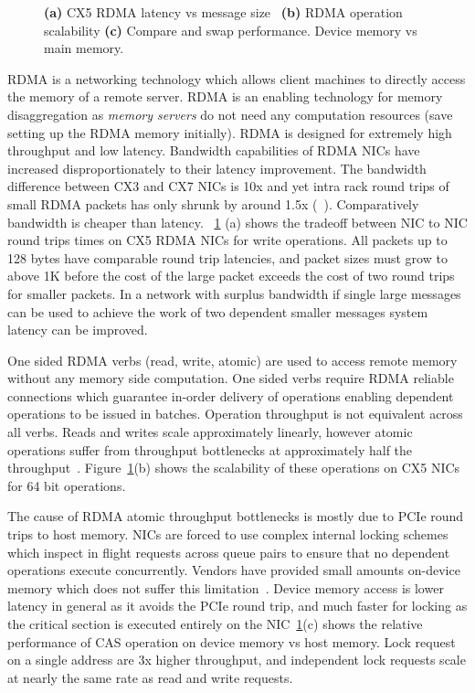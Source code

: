 \begin{figure}[t]
\begin{subfigure}{0.3\linewidth}
    \end{subfigure}
    \vspace{-1em}
    \caption{
    \textbf{(a)} CX5 RDMA latency vs message size~\cite{rdma-latency}
    \textbf{(b)} RDMA operation scalability
    \textbf{(c)} Compare and swap performance. Device memory vs main memory.
    }
    \label{fig:rdma-benchmarks}
\end{figure}

RDMA is a networking technology which allows client machines
to directly access the memory of a remote server. RDMA is an
enabling technology for memory disaggregation as
\textit{memory servers} do not need any computation
resources (save setting up the RDMA memory initially). RDMA
is designed for extremely high throughput and low latency.
Bandwidth capabilities of RDMA NICs have increased
disproportionately to their latency improvement. The
bandwidth difference between CX3 and CX7 NICs is 10x and yet
intra rack round trips of small RDMA packets has only shrunk
by around 1.5x (~). Comparatively bandwidth is
cheaper than latency. ~\ref{fig:rdma-benchmarks} (a) shows
the tradeoff between NIC to NIC round trips times on CX5
RDMA NICs for write operations. All packets up to 128 bytes
have comparable round trip latencies, and packet sizes must
grow to above 1K before the cost of the large packet exceeds
the cost of two round trips for smaller packets. In a
network with surplus bandwidth if single large messages can
be used to achieve the work of two dependent smaller
messages system latency can be improved.

One sided RDMA verbs (read, write, atomic) are used to
access remote memory without any memory side computation.
One sided verbs require RDMA reliable connections which
guarantee in-order delivery of operations enabling dependent
operations to be issued in batches. Operation throughput is
not equivalent across all verbs. Reads and writes scale
approximately linearly, however atomic operations suffer
from throughput bottlenecks at approximately half the
throughput~\cite{design-guidelines,sherman}.
Figure~\ref{fig:rdma-benchmarks}(b) shows the scalability of
these operations on CX5 NICs for 64 bit operations.

The cause of RDMA atomic throughput bottlenecks is mostly
due to PCIe round trips to host memory. NICs are forced to
use complex internal locking schemes which inspect in flight
requests across queue pairs to ensure that no dependent
operations execute concurrently. Vendors have provided small
amounts on-device memory which does not suffer this
limitation~\cite{device-memory}. Device memory access is
lower latency in general as it avoids the PCIe round trip,
and much faster for locking as the critical section is
executed entirely on the NIC~\ref{fig:rdma-benchmarks}(c)
shows the relative performance of CAS operation on device
memory vs host memory. Lock request on a single address are
3x higher throughput, and independent lock requests scale at
nearly the same rate as read and write requests.

